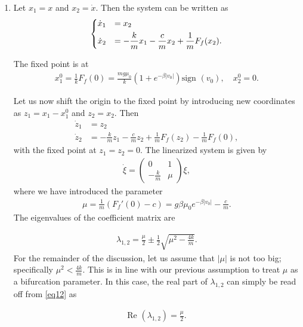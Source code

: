 \begin{solution}[4.4]
\begin{enumerate}
	\item Let $x_1=x$ and $x_2=\dot{x}$. Then the system can be written as
\begin{align}
	\begin{dcases}
\dot{x}_1&=x_2\\
\dot{x}_2&=-\frac{k}{m}x_1 -\frac{c}{m}x_2 +\frac{1}{m}F_f(x_2).
	\end{dcases}
\end{align}

The fixed point is at 
\begin{align}
x^{0}_1=\frac{1}{k}F_f(0)=\frac{mg\mu_0}{k}\left(1+e^{-\beta|v_0|} \right)\text{sign }(v_0), \quad x^{0}_2=0.
\end{align}

Let us now shift the origin to the fixed point by introducing new coordinates as $z_1 = x_1 - x^0_1$ and $z_2=x_2$. 
Then 
\begin{align}
\label{eq111}
\dot{z}_1&=z_2\\
\dot{z}_2&=-\frac{k}{m}z_1 -\frac{c}{m}z_2 +\frac{1}{m}F_f(z_2)-\frac{1}{m}F_f(0),
\end{align}
with the fixed point at $z_1=z_2=0$. The linearized system is given by
\begin{align}
\dot{\xi}=\begin{pmatrix} 0 & 1 \\ -\frac{k}{m} & \mu \end{pmatrix}\xi, 
\end{align}
where we have introduced the parameter
\begin{align}
\boxed{\mu=\frac{1}{m}\left(F_f'(0)-c\right) = g\beta \mu_0 e^{-\beta|v_0|}-\frac{c}{m}}. 
\end{align}
The eigenvalues of the coefficient matrix are 

\begin{align}
\label{eq12}
\lambda_{1,2} = \frac{\mu}{2}\pm \frac{1}{2}\sqrt{\mu^2-\frac{4k}{m}}.
\end{align}
For the remainder of the discussion, let us assume that  $|\mu|$ is not too big; specifically $\mu^2 < \frac{4k}{m}$. This is in line with our previous assumption to treat $\mu$ as a bifurcation parameter. In this case, the real part of $\lambda_{1,2}$ can simply be read off from \eqref{eq12} as 

\begin{align}
\text{Re }(\lambda_{1,2}) = \frac{\mu}{2}. 
\end{align}


\end{enumerate}
\end{solution}

